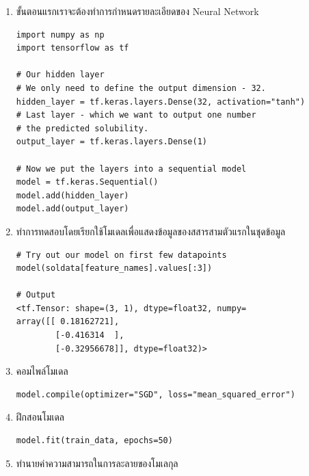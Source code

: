 \begin{enumerate}
\item ขั้นตอนแรกเราจะต้องทำการกำหนดรายละเอียดของ Neural Network

\begin{lstlisting}[style=MyPython]
import numpy as np
import tensorflow as tf

# Our hidden layer
# We only need to define the output dimension - 32.
hidden_layer = tf.keras.layers.Dense(32, activation="tanh")
# Last layer - which we want to output one number
# the predicted solubility.
output_layer = tf.keras.layers.Dense(1)

# Now we put the layers into a sequential model
model = tf.keras.Sequential()
model.add(hidden_layer)
model.add(output_layer)
\end{lstlisting}

\vspace{1em}

\item ทำการทดสอบโดยเรียกใช้โมเดลเพื่อแสดงข้อมูลของสสารสามตัวแรกในชุดข้อมูล

\begin{lstlisting}[style=MyPython]
# Try out our model on first few datapoints
model(soldata[feature_names].values[:3])

# Output
<tf.Tensor: shape=(3, 1), dtype=float32, numpy=
array([[ 0.18162721],
        [-0.416314  ],
        [-0.32956678]], dtype=float32)>
\end{lstlisting}

\vspace{1em}

\item คอมไพล์โมเดล

\begin{lstlisting}[style=MyPython]
model.compile(optimizer="SGD", loss="mean_squared_error")
\end{lstlisting}

\vspace{1em}

\item ฝึกสอนโมเดล

\begin{lstlisting}[style=MyPython]
model.fit(train_data, epochs=50)
\end{lstlisting}

\vspace{1em}

\item ทำนายค่าความสามารถในการละลายของโมเลกุล


\end{enumerate}
